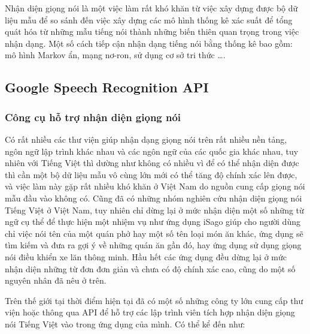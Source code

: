 \documentclass[12pt]{report}
\begin{document}
Nhận diện giọng nói là một việc làm rất khó khăn từ việc xây dựng được bộ dữ liệu mẫu để so sánh đến việc xây dựng các mô hình thống kê xác suất để tổng quát hóa từ những mẫu tiếng nói thành những biến thiên quan trọng trong việc nhận dạng. Một số cách tiếp cận nhận dạng tiếng nói bằng thống kê bao gồm: mô hình Markov ẩn, mạng nơ-ron, sử dụng cơ sở tri thức \ldots.

\subsection{Google Speech Recognition API}
\subsubsection{Công cụ hỗ trợ nhận diện giọng nói}
Có rất nhiều các thư viện giúp nhận dạng giọng nói trên rất nhiều nền tảng, ngôn ngữ lập trình khác nhau và các ngôn ngữ của các quốc gia khác nhau, tuy nhiên với Tiếng Việt thì dường như không có nhiều vì để có thể nhận diện được thì cần một bộ dữ liệu mẫu vô cùng lớn mới có thể tăng độ chính xác lên được, và việc làm này gặp rất nhiều khó khăn ở Việt Nam do nguồn cung cấp giọng nói mẫu đầu vào không có. Cũng đã có những nhóm nghiên cứu nhận diện giọng nói Tiếng Việt ở Việt Nam, tuy nhiên chỉ dừng lại ở mức nhận diện một số những từ ngữ cụ thể để thực hiện một nhiệm vụ như ứng dụng iSago giúp cho người dùng chỉ việc nói tên của một quán phở hay một số tên loại món ăn khác, ứng dụng sẽ tìm kiếm và đưa ra gợi ý về những quán ăn gần đó, hay ứng dụng sử dụng giọng nói điều khiển xe lăn thông minh. Hầu hết các ứng dụng đều dừng lại ở mức nhận diện những từ đơn đơn giản và chưa có độ chính xác cao, cũng do một số nguyên nhân đã nêu ở trên.

Trên thế giới tại thời điểm hiện tại đã có một số những công ty lớn cung cấp thư viện hoặc thông qua API để hỗ trợ các lập trình viên tích hợp nhận diện giọng nói Tiếng Việt vào trong ứng dụng của mình. Có thể kể đến như:
\end{document}
